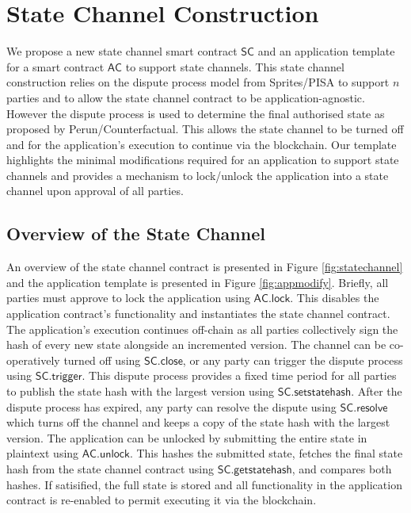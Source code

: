 \documentclass{llncs}
\newcommand{\statechannel}{\mathsf{SC}}
\newcommand{\statechanneldispute}{\mathsf{SC}.\mathsf{trigger}}
\newcommand{\statechannelsetstate}{\mathsf{SC}.\mathsf{setstatehash}}
\newcommand{\statechannelresolve}{\mathsf{SC}.\mathsf{resolve}}
\newcommand{\statechannelgetcommitment}{\mathsf{SC}.\mathsf{getstatehash}}
\newcommand{\statechannelclose}{\mathsf{SC}.\mathsf{close}}
\newcommand{\appcontract}{\mathsf{AC}}
\newcommand{\applock}{\mathsf{AC.lock}}
\newcommand{\appunlock}{\mathsf{AC.unlock}}
\begin{document}
\section{State Channel Construction} 

We propose a new state channel smart contract $\statechannel$ and an application template for a smart contract $\appcontract$ to support state channels. 
This state channel construction relies on the dispute process model from Sprites/PISA to support $n$ parties and to allow the state channel contract to be application-agnostic. 
However the dispute process is used to determine the final authorised state as proposed by Perun/Counterfactual. 
This allows the state channel to be turned off and for the application's execution to continue via the blockchain.
Our template highlights the minimal modifications required for an application to support state channels and provides a mechanism to lock/unlock the application into a state channel upon approval of all parties. 

\subsection{Overview of the State Channel}

An overview of the state channel contract is presented in Figure \ref{fig:statechannel} and the application template is presented in Figure \ref{fig:appmodify}. 
Briefly, all parties must approve to lock the application using $\applock$.
This disables the application contract's functionality and instantiates the state channel contract. 
The application's execution continues off-chain as all parties collectively sign the hash of every new state alongside an incremented version. %
The channel can be co-operatively turned off using $\statechannelclose$, or any party can trigger the dispute process using $\statechanneldispute$.
This dispute process provides  a fixed time period  for all parties to publish the state hash with the largest version using $\statechannelsetstate$. 
After the dispute process has expired, any party can resolve the dispute using $\statechannelresolve$ which turns off the channel and keeps a copy of the state hash with the largest version. 
The application can be unlocked by submitting the entire state in plaintext using $\appunlock$. 
This  hashes the submitted state, fetches the final state hash from the state channel contract using $\statechannelgetcommitment$, and  compares both hashes.
If satisified, the full state is stored and all functionality in the application contract is re-enabled to permit executing it via the blockchain. 
\end{document}
